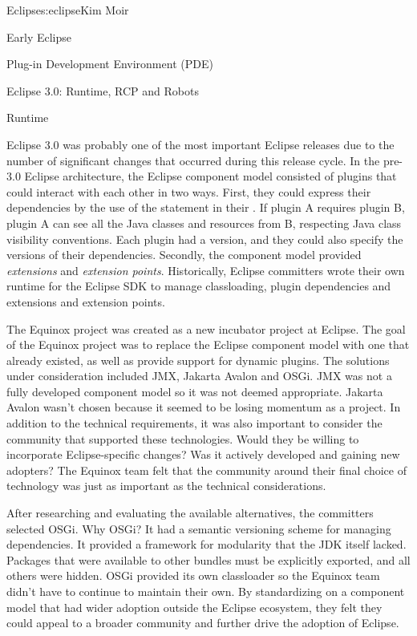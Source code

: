 \begin{aosachapter}{Eclipse}{s:eclipse}{Kim Moir}
\begin{aosasect1}{Early Eclipse}
\begin{aosasect2}{Plug-in Development Environment (PDE) }
\end{aosasect2}

\end{aosasect1}

\begin{aosasect1}{Eclipse 3.0: Runtime, RCP and Robots}

\begin{aosasect2}{Runtime}

Eclipse 3.0 was probably one of the most important Eclipse releases
due to the number of significant changes that occurred during this
release cycle.  In the pre-3.0 Eclipse architecture, the Eclipse component
model consisted of plugins that could interact with each other in two
ways.  First, they could express their dependencies by the use of
the  statement in their .  If plugin
A requires plugin B, plugin A can see all the Java classes and
resources from B, respecting Java class visibility conventions.  Each
plugin had a version, and they could also specify the versions of
their dependencies.  Secondly, the component model provided
\emph{extensions} and \emph{extension points}.  Historically, Eclipse
committers wrote their own runtime for the Eclipse SDK to manage
classloading, plugin dependencies and extensions and extension
points. 

The Equinox project was created as a new incubator project at Eclipse.
The goal of the Equinox project was to replace the Eclipse component
model with one that already existed, as well as provide
support for dynamic plugins. The solutions under consideration
included JMX, Jakarta Avalon and OSGi. JMX was not a fully developed component
model so it was not deemed appropriate. Jakarta Avalon wasn't chosen
because it seemed to be losing momentum as a project. In addition to
the technical requirements, it was also important to consider the
community that supported these technologies.  Would they be willing to
incorporate Eclipse-specific changes? Was it actively developed and
gaining new adopters?  The Equinox team felt that the community around
their final choice of technology was just as important as the
technical considerations.

After researching and evaluating the available alternatives, the
committers selected OSGi. Why OSGi?  It had a semantic versioning
scheme for managing dependencies. It provided a framework for
modularity that the JDK itself lacked. Packages that were available to
other bundles must be explicitly exported, and all others were hidden.
OSGi provided its own classloader so the Equinox team didn't have to
continue to maintain their own. By standardizing on a component model
that had wider adoption outside the Eclipse ecosystem, they felt they
could appeal to a broader community and further drive the adoption of
Eclipse.


\end{aosasect2}
\end{aosasect1}
\end{aosachapter}
